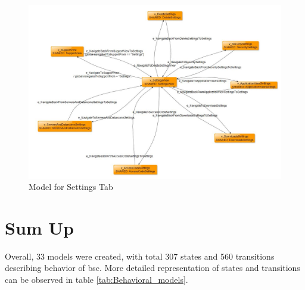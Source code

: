 \begin{figure} [htbp!]
	\centering
					\includegraphics[width=1\textwidth]{figures/Settings_model_screenshot}
					\caption{\label{Fig:Settings_model_screenshot} Model for Settings Tab}
\end{figure}

\section{Sum Up}
\par
Overall, 33 models were created, with total 307 states and 560 transitions describing behavior of \acrshort{bsc}. More detailed representation of states and transitions can be observed in table \ref{tab:Behavioral_models}.


